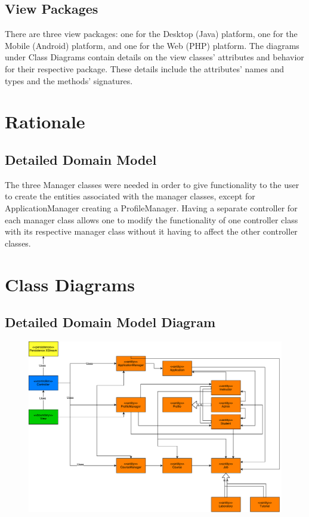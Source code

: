 \documentclass[12pt]{article}
\begin{document}
\subsection{View Packages}
There are three view packages: one for the Desktop (Java) platform, one for the Mobile (Android) platform, and one for the Web (PHP) platform. The diagrams under Class Diagrams contain details on the view classes' attributes and behavior for their respective package. These details include the attributes' names and types and the methods' signatures.
\section{Rationale}
\subsection{Detailed Domain Model}
The three Manager classes were needed in order to give functionality to the user to create the entities associated with the manager classes, except for ApplicationManager creating a ProfileManager. Having a separate controller for each manager class allows one to modify the functionality of one controller class with its respective manager class without it having to affect the other controller classes.
\section{Class Diagrams}
\subsection{Detailed Domain Model Diagram}
\begin{figure}[H]
	\centering
	\includegraphics[width =1\textwidth]{./ClassDiagrams/DetailedDomainModelDiagram.pdf}
\end{figure}
\end{document}
